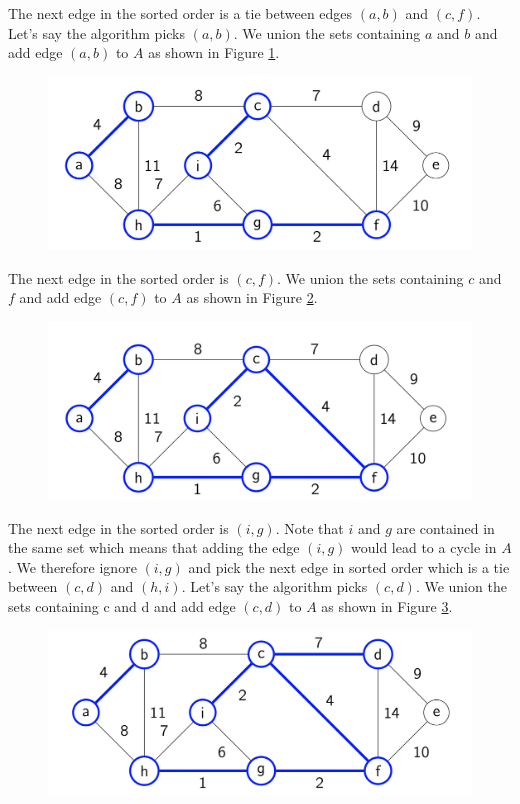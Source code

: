 \documentclass [12pt]{article}
\theoremstyle{definition}
\begin{document}
The next edge in the sorted order is a tie between edges $(a, b)$ and $(c, f )$. Let’s say the
algorithm picks $(a, b)$. We union the sets containing $a$ and $b$ and add edge $(a, b)$ to $A$ as shown in Figure \ref{fig:kruskal4}.

\begin{figure}[h!]
\centering
\includegraphics[scale=0.8]{kruskal4.png}
\caption{}
\label{fig:kruskal4}
\end{figure}


The next edge in the sorted order is $(c, f )$. We union the sets containing $c$ and $f$ and add edge $(c, f )$ to $A$ as shown in Figure \ref{fig:kruskal5}.

\begin{figure}[h!]
\centering
\includegraphics[scale=0.8]{kruskal5.png}
\caption{}
\label{fig:kruskal5}
\end{figure}

The next edge in the sorted order is $(i, g)$. Note that $i$ and $g$ are contained in the same set which means that adding the edge $(i, g)$ would lead to a cycle in $A$. We therefore ignore $(i, g)$ and pick the next edge in sorted order which is a tie between $(c, d)$ and $(h, i)$. Let’s say the algorithm picks $(c, d)$. We union the sets containing c and d and add edge $(c, d)$ to $ A$ as shown in Figure \ref{fig:kruskal6}.

\begin{figure}[h!]
\centering
\includegraphics[scale=0.8]{kruskal6.png}
\caption{}
\label{fig:kruskal6}
\end{figure}
\end{document}
